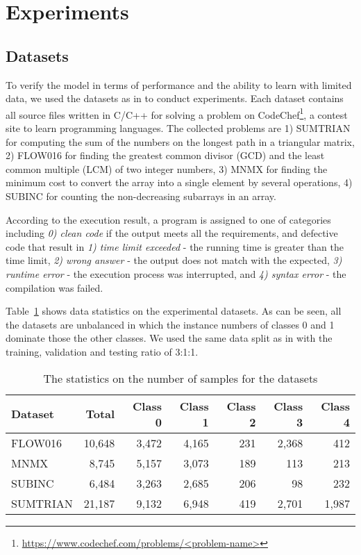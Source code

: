 \section{Experiments}
\label{sec:experiments}
\subsection {Datasets}
To verify the model in terms of performance and the ability to learn with limited data, we used the datasets as in \cite{phan2017convolutional} to conduct experiments. Each dataset contains all source files written in C/C++ for solving a problem on CodeChef\footnote{\url{https://www.codechef.com/problems/<problem-name>}}, a contest site to learn programming languages. The collected problems are 1) SUMTRIAN for computing the sum of the numbers on the longest path in a triangular matrix, 2) FLOW016 for finding the greatest common divisor (GCD) and the least common multiple (LCM) of two integer numbers, 3) MNMX for finding the minimum cost to convert the array into a single element by several operations, 4) SUBINC for counting the non-decreasing subarrays in an array.

According to the execution result, a program is assigned to one of categories including \textit{0) clean code} if the output meets all the requirements, and defective code that result in \textit{1) time limit exceeded} - the running time is greater than the time limit, \textit{2) wrong answer} - the output does not match with the expected, \textit{3) runtime error} - the execution process was interrupted, and \textit{4) syntax error} - the compilation was failed.         

Table~\ref{table:datastatistics} shows data statistics on the experimental datasets. As can be seen, all the datasets are unbalanced in which the instance numbers of classes 0 and 1 dominate those the other classes. We used the same data split as in \cite{phan2017convolutional} with the training, validation and testing ratio of 3:1:1.
\begin{table}[]
\centering
\setlength{\tabcolsep}{4pt}
\caption{The statistics on the number of samples for the datasets}
\label{table:datastatistics}
\begin{tabular}{lrrrrrr}
\hline
Dataset & Total & Class 0 & Class 1 & Class 2 & Class 3 & Class 4 \\ \hline
FLOW016 &10,648 &3,472 &4,165 &231 &2,368 &412 \\
MNMX    &8,745 &5,157 &3,073 &189 &113 &213 \\
SUBINC  &6,484&3,263&2,685&206&98&232\\
SUMTRIAN&21,187&9,132&6,948&419&2,701&1,987\\ \hline
\end{tabular}
\end{table}

